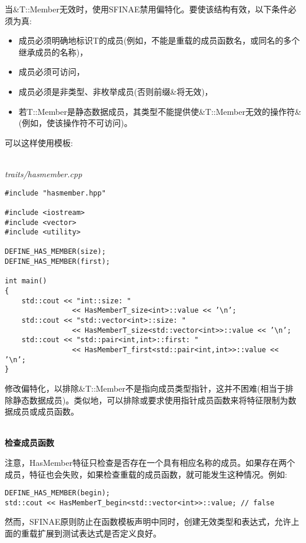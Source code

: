 当\&T::Member无效时，使用SFINAE禁用偏特化。要使该结构有效，以下条件必须为真:

\begin{itemize}
\item
成员必须明确地标识T的成员(例如，不能是重载的成员函数名，或同名的多个继承成员的名称)，

\item
成员必须可访问，

\item
成员必须是非类型、非枚举成员(否则前缀\&将无效)，

\item
若T::Member是静态数据成员，其类型不能提供使\&T::Member无效的操作符\&(例如，使该操作符不可访问)。
\end{itemize}

可以这样使用模板:

\hspace*{\fill} \\ %
\noindent
\textit{traits/hasmember.cpp}
\begin{lstlisting}[style=styleCXX]
#include "hasmember.hpp"

#include <iostream>
#include <vector>
#include <utility>

DEFINE_HAS_MEMBER(size);
DEFINE_HAS_MEMBER(first);

int main()
{
	std::cout << "int::size: "
				<< HasMemberT_size<int>::value << ’\n’;
	std::cout << "std::vector<int>::size: "
				<< HasMemberT_size<std::vector<int>>::value << ’\n’;
	std::cout << "std::pair<int,int>::first: "
				<< HasMemberT_first<std::pair<int,int>>::value << ’\n’;
}
\end{lstlisting}

修改偏特化，以排除\&T::Member不是指向成员类型指针，这并不困难(相当于排除静态数据成员)。类似地，可以排除或要求使用指针成员函数来将特征限制为数据成员或成员函数。

\hspace*{\fill} \\ %
\noindent
\textbf{检查成员函数}

注意，HasMember特征只检查是否存在一个具有相应名称的成员。如果存在两个成员，特征也会失败，如果检查重载的成员函数，就可能发生这种情况。例如:

\begin{lstlisting}[style=styleCXX]
DEFINE_HAS_MEMBER(begin);
std::cout << HasMemberT_begin<std::vector<int>>::value; // false
\end{lstlisting}

然而，SFINAE原则防止在函数模板声明中同时，创建无效类型和表达式，允许上面的重载扩展到测试表达式是否定义良好。

